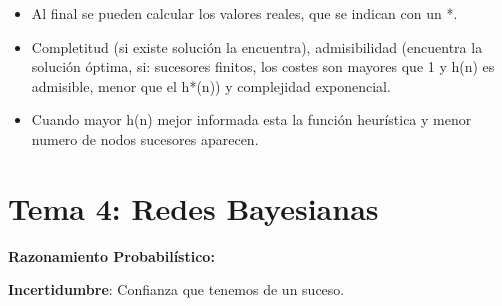 \documentclass[12pt, twoside, openright]{report} %
\begin{document}
\begin{itemize}
    \begin{itemize}
    \item Al final se pueden calcular los valores reales, que se indican con
      un *.
      
    \item Completitud (si existe solución la encuentra), admisibilidad
      (encuentra la solución óptima, si: sucesores finitos, los costes
      son mayores que 1 y h(n) es admisible, menor que el h*(n)) y
      complejidad exponencial.
      
    \item Cuando mayor h(n) mejor informada esta la función heurística y
      menor numero de nodos sucesores aparecen.
      
    \end{itemize}
  \end{itemize}


\chapter{Tema 4: Redes Bayesianas}


  \textbf{Razonamiento Probabilístico:}

  \textbf{Incertidumbre}: Confianza que tenemos de un suceso.
\end{document}
